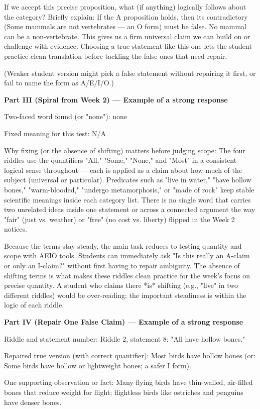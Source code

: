 \documentclass[12pt]{article}
\begin{document}
If we accept this precise proposition, what (if anything) logically follows about the category? Briefly explain: If the A proposition holds, then its contradictory (Some mammals are not vertebrates — an O form) must be false. No mammal can be a non-vertebrate. This gives us a firm universal claim we can build on or challenge with evidence. Choosing a true statement like this one lets the student practice clean translation before tackling the false ones that need repair.

(Weaker student version might pick a false statement without repairing it first, or fail to name the form as A/E/I/O.)

\textbf{Part III (Spiral from Week 2) — Example of a strong response}

Two-faced word found (or "none"): none

Fixed meaning for this test: N/A

Why fixing (or the absence of shifting) matters before judging scope: The four riddles use the quantifiers "All," "Some," "None," and "Most" in a consistent logical sense throughout — each is applied as a claim about how much of the subject (universal or particular). Predicates such as "live in water," "have hollow bones," "warm-blooded," "undergo metamorphosis," or "made of rock" keep stable scientific meanings inside each category list. There is no single word that carries two unrelated ideas inside one statement or across a connected argument the way "fair" (just vs. weather) or "free" (no cost vs. liberty) flipped in the Week 2 notices.

Because the terms stay steady, the main task reduces to testing quantity and scope with AEIO tools. Students can immediately ask "Is this really an A-claim or only an I-claim?" without first having to repair ambiguity. The absence of shifting terms is what makes these riddles clean practice for the week's focus on precise quantity. A student who claims there *is* shifting (e.g., "live" in two different riddles) would be over-reading; the important steadiness is within the logic of each riddle.

\textbf{Part IV (Repair One False Claim) — Example of a strong response}

Riddle and statement number: Riddle 2, statement 8: "All have hollow bones."

Repaired true version (with correct quantifier): Most birds have hollow bones (or: Some birds have hollow or lightweight bones; a safer I form).

One supporting observation or fact: Many flying birds have thin-walled, air-filled bones that reduce weight for flight; flightless birds like ostriches and penguins have denser bones.
\end{document}
